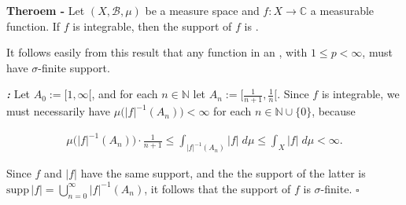 \documentclass[12pt]{article}
\begin{document}
{\bf Theroem -} Let $(X, \mathcal{B}, \mu)$ be a measure space and $f:X \to \mathbb{C}$ a measurable function. If $f$ is integrable, then the support of $f$ is .

It follows easily from this result that any function in an , with $1 \leq p < \infty$, must have $\sigma$-finite support.

{\bf \emph{:}} Let $A_0 := [1, \infty[$, and for each $n \in \mathbb{N}$ let $A_n:= [\frac{1}{n+1}, \frac{1}{n}[$. Since $f$ is integrable, we must necessarily have $\mu \big(|f|^{-1}(A_n)\big) < \infty$ for each $n \in \mathbb{N} \cup \{0\}$, because

\begin{align*}
\mu \big(|f|^{-1} (A_n) \big) \cdot \frac{1}{n+1} \leq \int_{|f|^{-1}(A_n)} |f| \;d\mu \leq \int_X |f| \;d\mu < \infty.
\end{align*}

Since $f$ and $|f|$ have the same support, and the the support of the latter is $\displaystyle \mathrm{supp} \,  |f| = \bigcup_{n = 0}^{\infty} |f|^{-1} (A_n)$, it follows that the support of $f$ is $\sigma$-finite. $\square$
\end{document}
